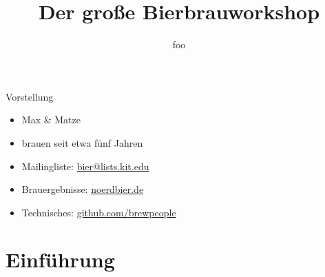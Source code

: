\documentclass[9pt, ngerman]{beamer}
\title{Der große Bierbrauworkshop}
\author{foo}
\begin{document}
\maketitle


\begin{frame}{Vorstellung}
  \begin{itemize}
    \item Max \& Matze
    \item brauen seit etwa fünf Jahren
  \end{itemize}

  \begin{itemize}
    \item Mailingliste: \url{bier@lists.kit.edu}
    \item Brauergebnisse: \url{noerdbier.de}
    \item Technisches: \url{github.com/brewpeople}
  \end{itemize}
\end{frame}

\section{Einführung}
\end{document}
